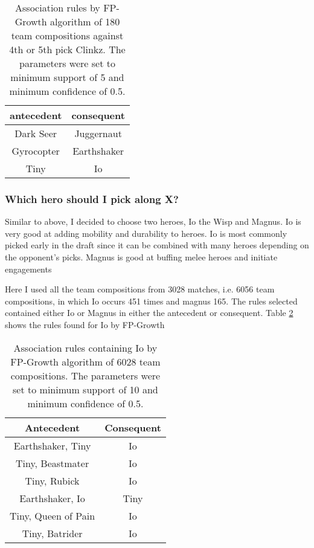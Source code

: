 \documentclass[result.tex]{subfiles}
\begin{document}
\begin{table}[H]
  \centering
  \begin{tabular}{ | c | c | }
    \hline
    antecedent & consequent \\ \hline
    Dark Seer & Juggernaut \\ \hline
    Gyrocopter & Earthshaker \\ \hline
    Tiny & Io \\
    \hline
  \end{tabular}
  \caption{Association rules by FP-Growth algorithm of 180 team compositions against 4th or 5th pick Clinkz. The parameters were set to minimum support of 5 and minimum confidence of 0.5.}
  \label{tab:ass_clinkz}
\end{table}

\subsubsection*{Which hero should I pick along X?}

Similar to above, I decided to choose two heroes, Io the Wisp and Magnus. Io is very good at adding mobility and durability to heroes. Io is most commonly picked early in the draft since it can be combined with many heroes depending on the opponent's picks. Magnus is good at buffing melee heroes and initiate engagements

Here I used all the team compositions from 3028 matches, i.e. 6056 team compositions, in which Io occurs 451 times and magnus 165. The rules selected contained either Io or Magnus in either the antecedent or consequent. Table \ref{tab:ass_io} shows the rules found for Io by FP-Growth

\begin{table}[H]
  \centering
  \begin{tabular}{ | c | c | }
    \hline
    Antecedent & Consequent \\ \hline
    Earthshaker, Tiny & Io \\ \hline
    Tiny, Beastmater & Io \\ \hline
    Tiny, Rubick & Io \\ \hline
    Earthshaker, Io & Tiny  \\ \hline
    Tiny, Queen of Pain & Io \\ \hline
    Tiny, Batrider & Io \\
    \hline
  \end{tabular}
  \caption{Association rules containing Io by FP-Growth algorithm of 6028 team compositions. The parameters were set to minimum support of 10 and minimum confidence of 0.5.}
  \label{tab:ass_io}
\end{table}
\end{document}
